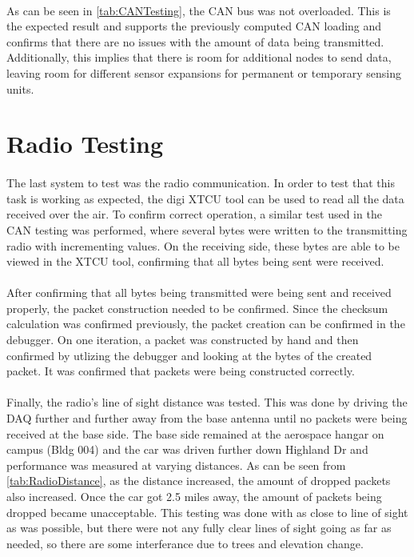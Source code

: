 \paragraph{}
As can be seen in \cref{tab:CANTesting}, the CAN bus was not overloaded.
This is the expected result and supports the previously computed CAN loading and confirms that there are no issues with the amount of data being transmitted.
Additionally, this implies that there is room for additional nodes to send data, leaving room for different sensor expansions for permanent or temporary sensing units.

\section{Radio Testing}

\paragraph{}
The last system to test was the radio communication.
In order to test that this task is working as expected, the digi XTCU tool can be used to read all the data received over the air.
To confirm correct operation, a similar test used in the CAN testing was performed, where several bytes were written to the transmitting radio with incrementing values.
On the receiving side, these bytes are able to be viewed in the XTCU tool, confirming that all bytes being sent were received.

\paragraph{}
After confirming that all bytes being transmitted were being sent and received properly, the packet construction needed to be confirmed.
Since the checksum calculation was confirmed previously, the packet creation can be confirmed in the debugger.
On one iteration, a packet was constructed by hand and then confirmed by utlizing the debugger and looking at the bytes of the created packet.
It was confirmed that packets were being constructed correctly.

\paragraph{}
Finally, the radio's line of sight distance was tested.
This was done by driving the DAQ further and further away from the base antenna until no packets were being received at the base side.
The base side remained at the aerospace hangar on campus (Bldg 004) and the car was driven further down Highland Dr and performance was measured at varying distances.
As can be seen from \cref{tab:RadioDistance}, as the distance increased, the amount of dropped packets also increased.  Once the car got 2.5 miles away, the amount of packets being dropped became unacceptable.
This testing was done with as close to line of sight as was possible, but there were not any fully clear lines of sight going as far as needed, so there are some interferance due to trees and elevation change.

